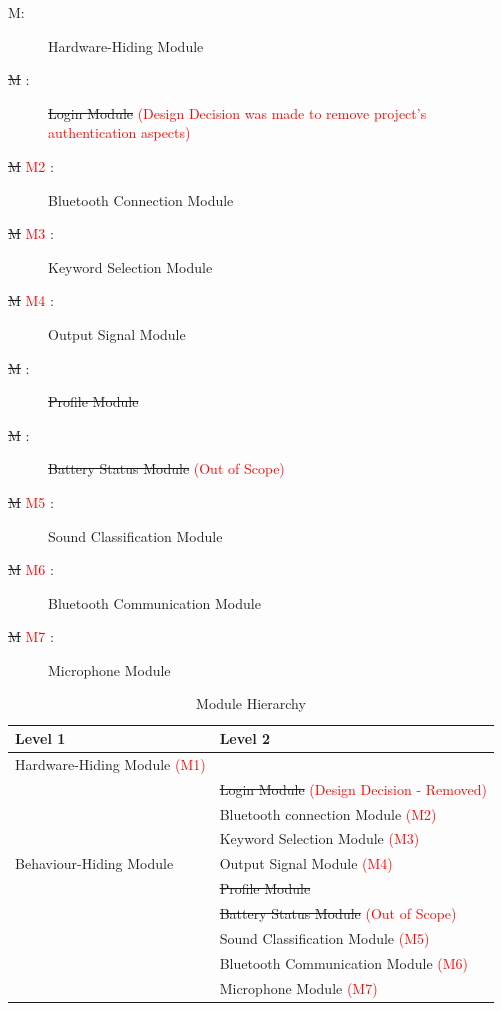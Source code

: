 \documentclass[12pt, titlepage]{article}
\newcounter{mnum}
\newcommand{\mthemnum}{M\themnum}
\begin{document}
\begin{description}
\item [ \mthemnum \label{mHH}:] Hardware-Hiding Module
\item [ \sout{\mthemnum} \label{mLogin}:] \sout{Login Module} \textcolor{red}{(Design Decision was made to remove project's authentication aspects)}
\item [ \sout{\mthemnum} \textcolor{red}{M2} \label{mBluetooth}:] Bluetooth Connection Module
\item [ \sout{\mthemnum} \textcolor{red}{M3} \label{mKeyword}:] Keyword Selection Module
\item [ \sout{\mthemnum} \textcolor{red}{M4} \label{mOutput}:] Output Signal Module
\item [ \sout{\mthemnum} \label{mProfile}:] \sout{Profile Module}
\item [ \sout{\mthemnum} \label{mBattery}:] \sout{Battery Status Module} \textcolor{red}{(Out of Scope)}
\item [ \sout{\mthemnum} \textcolor{red}{M5} \label{mSound}:] Sound Classification Module
\item [ \sout{\mthemnum} \textcolor{red}{M6} \label{mComm}:] Bluetooth Communication Module
\item [ \sout{\mthemnum} \textcolor{red}{M7} \label{mMicrophone}:] Microphone Module
\end{description}


\begin{table}[h!]
\centering
\begin{tabular}{p{} p{}}
\toprule
\textbf{Level 1} & \textbf{Level 2}\\
\midrule
{Hardware-Hiding Module \textcolor{red}{(M1)}} & ~ \\
\midrule

\multirow{7}{0.3\textwidth}{Behaviour-Hiding Module} & \sout{Login Module} \textcolor{red}{(Design Decision - Removed)}\\
& Bluetooth connection Module \textcolor{red}{(M2)}\\
& Keyword Selection Module \textcolor{red}{(M3)}\\
& Output Signal Module \textcolor{red}{(M4)}\\
& \sout{Profile Module}\\ 
& \sout{Battery Status Module} \textcolor{red}{(Out of Scope)}\\
\midrule

\multirow{3}{0.3\textwidth}{Software Decision Module} & {Sound Classification Module} \textcolor{red}{(M5)}\\
& Bluetooth Communication Module \textcolor{red}{(M6)}\\
& Microphone Module \textcolor{red}{(M7)}\\
\bottomrule

\end{tabular}
\caption{Module Hierarchy}
\label{TblMH}
\end{table}
\end{document}
